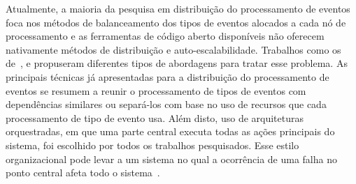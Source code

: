 



Atualmente, a maioria da pesquisa em distribuição do processamento de eventos foca nos métodos de balanceamento dos tipos de eventos alocados a cada nó de processamento e as ferramentas de código aberto disponíveis não oferecem nativamente métodos de distribuição e auto-escalabilidade. Trabalhos como os de~\cite{Isoyama:2012:SCE:2335484.2335498}, \cite{6906776} e \cite{Balkesen:2013:RRI:2488222.2488257} propuseram diferentes tipos de abordagens para tratar esse problema. As principais técnicas já apresentadas para a distribuição do processamento de eventos se resumem a reunir o processamento de tipos de eventos com dependências similares ou separá-los com base no uso de recursos que cada processamento de tipo de evento usa. Além disto, uso de arquiteturas orquestradas, em que uma parte central executa todas as ações principais do sistema, foi escolhido por todos os trabalhos pesquisados. Esse estilo organizacional pode levar a um sistema no qual a ocorrência de uma falha no ponto central afeta todo o sistema~\citep{Newman:2015:BM:2904388}. 





